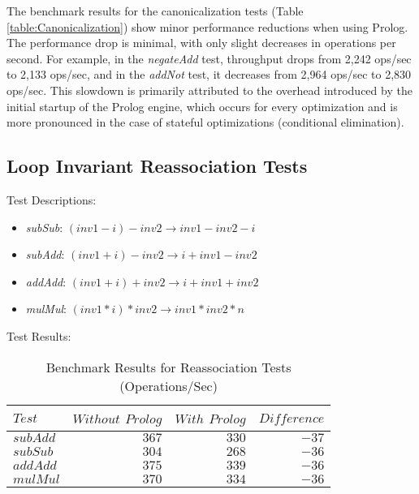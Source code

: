 \vspace{-10pt}

The benchmark results for the canonicalization tests (Table \ref{table:Canonicalization}) show minor performance reductions when using Prolog. The performance drop is minimal, with only slight decreases in operations per second. For example, in the \textit{negateAdd} test, throughput drops from 2,242 ops/sec to 2,133 ops/sec, and in the \textit{addNot} test, it decreases from 2,964 ops/sec to 2,830 ops/sec.
This slowdown is primarily attributed to the overhead introduced by the initial startup of the Prolog engine, which occurs for every optimization and is more pronounced in the case of stateful optimizations (conditional elimination).

\subsection*{Loop Invariant Reassociation Tests}
Test Descriptions:
\begin{itemize}
    \item \textit{subSub}: $(inv1 - i) - inv2 \rightarrow inv1 - inv2 - i$
    \item \textit{subAdd}: $(inv1 + i) - inv2 \rightarrow i + inv1 - inv2$
    \item \textit{addAdd}: $(inv1 + i) + inv2 \rightarrow i + inv1 + inv2$
    \item \textit{mulMul}: $(inv1 * i) * inv2 \rightarrow inv1 * inv2 * n$
\end{itemize}

Test Results:
\begin{table}[h]
    \centering
    \begin{tabular}{|l|r|r|r|}
        \hline
        $Test$ & $Without$ $Prolog$ & $With$ $Prolog$ & $Difference$ \\
        \hline
        $subAdd$ & $367$ & $330$ & $-37$ \\
        $subSub$ & $304$ & $268$ & $-36$ \\
        $addAdd$ & $375$ & $339$ & $-36$ \\
        $mulMul$ & $370$ & $334$ & $-36$ \\
        \hline
    \end{tabular}
    \caption{Benchmark Results for Reassociation Tests (Operations/Sec)}
    \label{table:Reassociation}
\end{table}

\vspace{-10pt}

